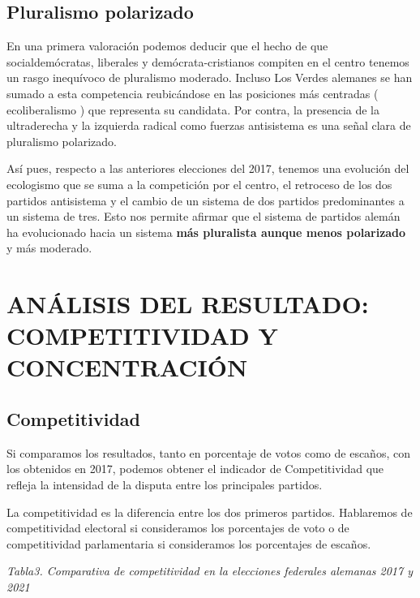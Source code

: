 \documentclass[
]{article}
\begin{document}
\hypertarget{pluralismo-polarizado}{%
\subsection{Pluralismo polarizado}\label{pluralismo-polarizado}}

En una primera valoración podemos deducir que el hecho de que
socialdemócratas, liberales y demócrata-cristianos compiten en el centro
tenemos un rasgo inequívoco de pluralismo moderado. Incluso Los Verdes
alemanes se han sumado a esta competencia reubicándose en las posiciones
más centradas ( ecoliberalismo ) que representa su candidata. Por
contra, la presencia de la ultraderecha y la izquierda radical como
fuerzas antisistema es una señal clara de pluralismo polarizado.

Así pues, respecto a las anteriores elecciones del 2017, tenemos una
evolución del ecologismo que se suma a la competición por el centro, el
retroceso de los dos partidos antisistema y el cambio de un sistema de
dos partidos predominantes a un sistema de tres. Esto nos permite
afirmar que el sistema de partidos alemán ha evolucionado hacia un
sistema \textbf{más pluralista aunque menos polarizado} y más moderado.

\hypertarget{anuxe1lisis-del-resultado-competitividad-y-concentraciuxf3n}{%
\section{ANÁLISIS DEL RESULTADO: COMPETITIVIDAD Y
CONCENTRACIÓN}\label{anuxe1lisis-del-resultado-competitividad-y-concentraciuxf3n}}

\hypertarget{competitividad}{%
\subsection{Competitividad}\label{competitividad}}

Si comparamos los resultados, tanto en porcentaje de votos como de
escaños, con los obtenidos en 2017, podemos obtener el indicador de
Competitividad que refleja la intensidad de la disputa entre los
principales partidos.

La competitividad es la diferencia entre los dos primeros partidos.
Hablaremos de competitividad electoral si consideramos los porcentajes
de voto o de competitividad parlamentaria si consideramos los
porcentajes de escaños.

\emph{Tabla3. Comparativa de competitividad en la elecciones federales
alemanas 2017 y 2021}
\end{document}
